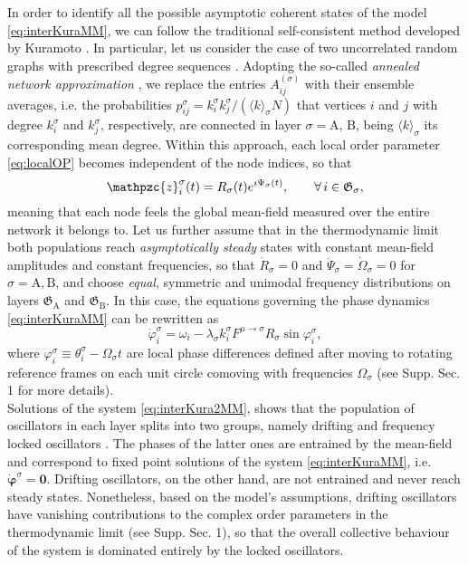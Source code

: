 \documentclass[pre,twocolumn,superscriptaddress]{revtex4}
\newcommand{\1}{\mathds{1}}
\begin{document}
{In order to identify all the possible asymptotic coherent states of the model \eqref{eq:interKuraMM}, we can follow the traditional self-consistent method developed by Kuramoto \cite{kuramoto-proceedings1975,kuramoto2012chemical}. 
In particular, let us consider the case of two uncorrelated random graphs with prescribed degree sequences \cite{bollobas2001random,newman-book2010,cohen-book2010}. 
Adopting the so-called {\em annealed network approximation} \cite{bianconi2002mean,dorogovtsev2010lectures,boccaletti-physicsreports2014}, we replace the entries $A_{ij}^{(\sigma)}$ with their ensemble averages, i.e. the probabilities $p_{ij}^{\sigma}=k_i^{\sigma}k_j^{\sigma}/(\langle k\rangle_\sigma N)$ that vertices $i$ and $j$ with degree $k_i^\sigma$ and $k_j^\sigma$, respectively, are connected in layer $\sigma=\mathrm{A},\,\mathrm{B}$, being $\langle k\rangle_\sigma$ its corresponding mean degree. 
Within this approach, each local order parameter \eqref{eq:localOP} becomes independent of the node indices, so that 
\begin{equation}\label{eq:OPKuramoto}
\mathpzc{z}_i^\sigma(t)=R_\sigma(t)e^{\imath\Psi_\sigma(t)},\qquad\forall\,i\in\mathfrak{G}_\sigma,
\end{equation}
meaning that each node feels the global mean-field measured over the entire network it belongs to. Let us further assume that in the thermodynamic limit both populations reach {\em asymptotically steady} states with constant mean-field amplitudes and constant frequencies, so that $\dot{R}_\sigma=0$ and $\ddot{\Psi}_\sigma=\dot{\Omega}_\sigma=0$ for $\sigma=\mathrm{A},\mathrm{B}$, and choose {\em equal}, symmetric and unimodal frequency distributions on layers $\mathfrak{G}_\mathrm{A}$ and $\mathfrak{G}_\mathrm{B}$. 
In this case, the equations governing the phase dynamics \eqref{eq:interKuraMM} can be rewritten as
\begin{equation}\label{eq:interKura2MM}
\dot{\varphi}_i^\sigma=\omega_i-\lambda_\sigma k_i^{\sigma}F^{\mu\to\sigma}R_{\sigma}\sin\varphi_i^\sigma,
\end{equation}
where $\varphi_i^\sigma\equiv\theta_i^\sigma-\Omega_\sigma t$ are local phase differences \cite{basnarkov2008kuramoto,petkoski2013mean,iatsenko2013stationary} defined after moving to rotating reference frames on each unit circle comoving with frequencies $\Omega_\sigma$ (see Supp. Sec. 1 for more details).\\
\indent
Solutions of the system \eqref{eq:interKura2MM}, shows that the population of oscillators in each layer splits into two groups, namely drifting and frequency locked oscillators \cite{strogatz2000kuramoto}. The phases of the latter ones are entrained by the mean-field and correspond to fixed point solutions of the system \eqref{eq:interKuraMM}, i.e. $\dot{\boldsymbol{\varphi}}^\sigma=\boldsymbol{0}$. Drifting oscillators, on the other hand, are not entrained and never reach steady states. Nonetheless, based on the model's assumptions, drifting oscillators have vanishing contributions to the complex order parameters in the thermodynamic limit (see Supp. Sec. 1), so that the overall collective behaviour of the system is dominated entirely by the locked oscillators. 
}
\end{document}
